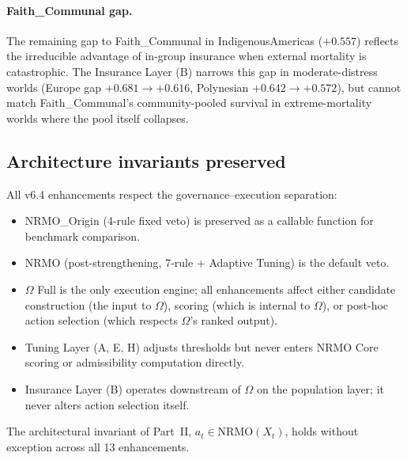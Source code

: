 \paragraph{Faith\_Communal gap.}
The remaining gap to Faith\_Communal in IndigenousAmericas
($+0.557$) reflects the irreducible advantage of in-group insurance
when external mortality is catastrophic. The Insurance Layer (B)
narrows this gap in moderate-distress worlds (Europe gap $+0.681
\to +0.616$, Polynesian $+0.642 \to +0.572$), but cannot match
Faith\_Communal's community-pooled survival in extreme-mortality
worlds where the pool itself collapses.

\subsection{Architecture invariants preserved}
\label{sec:v64-invariants}

All v6.4 enhancements respect the governance--execution separation:
\begin{itemize}
\item NRMO\_Origin (4-rule fixed veto) is preserved as a callable
  function for benchmark comparison.
\item NRMO (post-strengthening, 7-rule + Adaptive Tuning) is the
  default veto.
\item $\Omega$ Full is the only execution engine; all enhancements
  affect either candidate construction (the input to $\Omega$),
  scoring (which is internal to $\Omega$), or post-hoc action
  selection (which respects $\Omega$'s ranked output).
\item Tuning Layer (A, E, H) adjusts thresholds but never enters
  NRMO Core scoring or admissibility computation directly.
\item Insurance Layer (B) operates downstream of $\Omega$ on the
  population layer; it never alters action selection itself.
\end{itemize}

The architectural invariant of Part~II,
$a_t \in \mathrm{NRMO}(X_t)$, holds without exception across all 13
enhancements.
